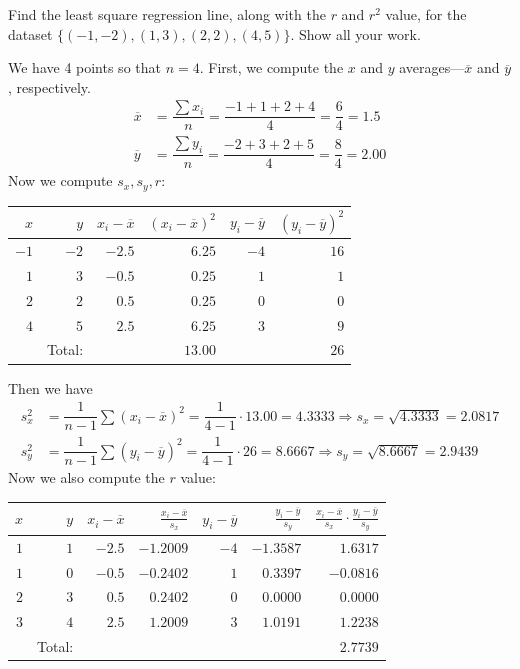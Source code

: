 \documentclass[11pt,letterpaper]{article}
\begin{document}

 Find the least square regression line, along with the $r$ and $r^2$ value, for the dataset $\{ (-1, -2), (1, 3), (2, 2), (4, 5) \}$. Show all your work. \pspace

\sol We have 4 points so that $n= 4$. First, we compute the $x$ and $y$ averages---$\overline{x}$ and $\overline{y}$, respectively. 
	\[
	\begin{aligned}
	\overline{x}&= \dfrac{\sum x_i}{n}= \dfrac{-1 + 1 + 2 + 4}{4}= \dfrac{6}{4}= 1.5 \\
	\overline{y}&= \dfrac{\sum y_i}{n}= \dfrac{-2 + 3 + 2 + 5}{4}= \dfrac{8}{4}= 2.00 
	\end{aligned}
	\]
Now we compute $s_x, s_y, r$:
	\begin{table}[!ht]
	\centering
	\begin{tabular}{rrrrrr}
	$x$ & $y$ & $x_i - \overline{x}$ & $(x_i - \overline{x})^2$ & $y_i - \overline{y}$ & $(y_i - \overline{y})^2$ \\ \hline
	$-1$ & $-2$ & $-2.5$ & $6.25$ & $-4$ & $16$ \\ 
	$1$ & $3$ & $-0.5$ & $0.25$ & $1$ & $1$ \\
	$2$ & $2$ & $0.5$ & $0.25$ & $0$ & $0$ \\
	$4$ & $5$ & $2.5$ & $6.25$ & $3$ & $9$ \\ \hline
	& Total: & & $13.00$ & & $26$ 
	\end{tabular}
	\end{table}
Then we have
	\[
	\begin{aligned}
	s_x^2&= \dfrac{1}{n - 1} \sum (x_i - \overline{x})^2= \dfrac{1}{4 - 1} \cdot 13.00= 4.3333 \Longrightarrow s_x= \sqrt{4.3333}= 2.0817 \\
	s_y^2&= \dfrac{1}{n - 1} \sum (y_i - \overline{y})^2= \dfrac{1}{4 - 1} \cdot 26= 8.6667 \Longrightarrow s_y= \sqrt{8.6667}= 2.9439
	\end{aligned}
	\]
Now we also compute the $r$ value:
	\begin{table}[!ht]
	\centering
	\begin{tabular}{rrrrrrr}
	$x$ & $y$ & $x_i - \overline{x}$ & $\frac{x_i - \overline{x}}{s_x}$ & $y_i - \overline{y}$ & $\frac{y_i - \overline{y}}{s_y}$ & $\frac{x_i - \overline{x}}{s_x} \cdot \frac{y_i - \overline{y}}{s_y}$ \\ \hline
	$1$ & $1$ & $-2.5$ & $-1.2009$ & $-4$ & $-1.3587$ & $1.6317$ \\ 
	$1$ & $0$ & $-0.5$ & $-0.2402$ & $1$ & $0.3397$ & $-0.0816$ \\
	$2$ & $3$ & $0.5$ & $0.2402$ & $0$ & $0.0000$ & $0.0000$ \\
	$3$ & $4$ & $2.5$ & $1.2009$ & $3$ & $1.0191$ & $1.2238$ \\ \hline
	& Total: & &  & & & $2.7739$
	\end{tabular}
	\end{table}
\end{document}
